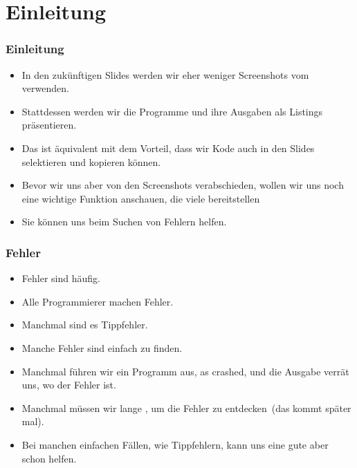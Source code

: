 \documentclass[aspectratio=169,mathserif,notheorems]{beamer}%
\subtitle{14.~Fehler im Kode mit Exceptions und IDE finden}%
\begin{document}
%
%
\startPresentation%
%
\section{Einleitung}%
\begin{frame}%
\frametitle{Einleitung}%
\begin{itemize}%
\item In den zukünftigen Slides werden wir eher weniger Screenshots vom \pycharm\  verwenden.%
\item<2-> Stattdessen werden wir die Programme und ihre Ausgaben als Listings präsentieren.%
\item<3-> Das ist äquivalent mit dem Vorteil, dass wir Kode auch in den Slides selektieren und kopieren können.%
\item<4-> Bevor wir uns aber von den Screenshots verabschieden, wollen wir uns noch eine wichtige Funktion anschauen, die viele  bereitstellen%
\item<5-> Sie können uns beim Suchen von Fehlern helfen.%
\end{itemize}%
\end{frame}%
%
\begin{frame}%
\frametitle{Fehler}%
\begin{itemize}%
\item Fehler sind häufig.%
\item<2-> \alert{Alle Programmierer machen Fehler.}%
\item<3-> Manchmal sind es Tippfehler.%
\item<9-> Manche Fehler sind einfach zu finden.%
\item<10-> Manchmal führen wir ein Programm aus, as crashed, und die Ausgabe verrät uns, wo der Fehler ist.
\item<11-> Manchmal müssen wir lange , um die Fehler zu entdecken~(das kommt später mal).%
\item<12-> Bei manchen einfachen Fällen, wie Tippfehlern, kann uns eine gute  aber schon helfen.%
\end{itemize}%
\end{frame}%
%
\end{document}
